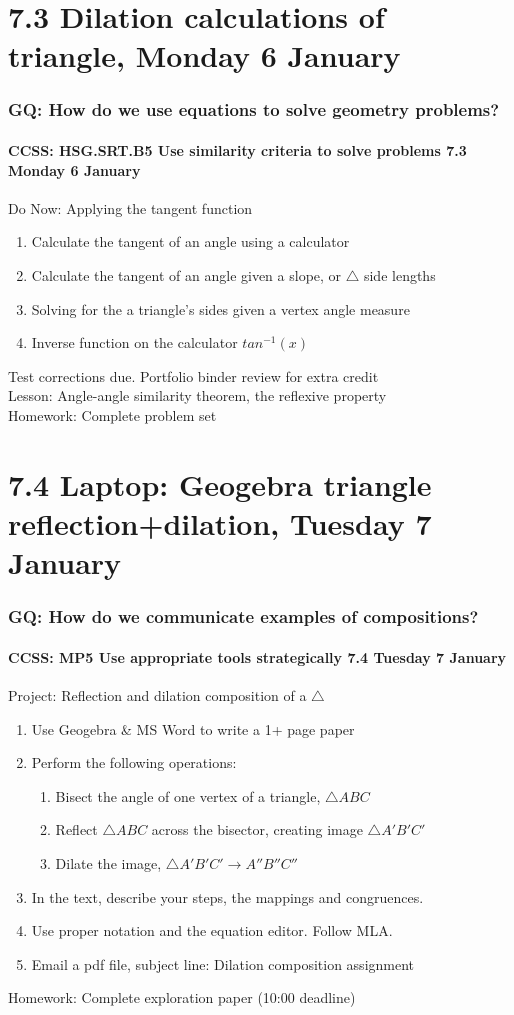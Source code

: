 \documentclass{beamer}
\begin{document}
\section{7.3 Dilation calculations of triangle, Monday 6 January}
\frame
{
  \frametitle{GQ: How do we use equations to solve geometry problems?}
  \framesubtitle{CCSS: HSG.SRT.B5 Use similarity criteria to solve problems \hfill \alert{7.3 Monday 6 January}}

  \begin{block}{Do Now: Applying the tangent function}
  \begin{enumerate}
    \item Calculate the tangent of an angle using a calculator
    \item Calculate the tangent of an angle given a slope, or $\triangle$ side lengths
    \item Solving for the a triangle's sides given a vertex angle measure
    \item Inverse function on the calculator $tan^{-1}(x)$
  \end{enumerate}
  \end{block}
  Test corrections due. Portfolio binder review for extra credit \\
  Lesson: Angle-angle similarity theorem, the reflexive property \\
  Homework: Complete problem set 
}

\section{7.4 Laptop: Geogebra triangle reflection+dilation, Tuesday 7 January}
\frame
{
  \frametitle{GQ: How do we communicate examples of compositions?}
  \framesubtitle{CCSS: MP5 Use appropriate tools strategically \hfill \alert{7.4 Tuesday 7 January}}

  \begin{block}{Project: Reflection and dilation composition of a $\triangle$}
  \begin{enumerate}
    \item Use Geogebra \& MS Word to write a 1+ page paper
    \item Perform the following operations:
    \begin{enumerate}
      \item Bisect the angle of one vertex of a triangle, $\triangle ABC$
      \item Reflect $\triangle ABC$ across the bisector, creating image $\triangle A'B'C'$
      \item Dilate the image, $\triangle A'B'C' \rightarrow A''B''C''$
    \end{enumerate}
    \item In the text, describe your steps, the mappings and congruences. 
    \item Use proper notation and the equation editor. Follow MLA.
    \item Email a pdf file, subject line: Dilation composition assignment
  \end{enumerate}
  \end{block}
  Homework: Complete exploration paper (10:00 deadline)
}
\end{document}
